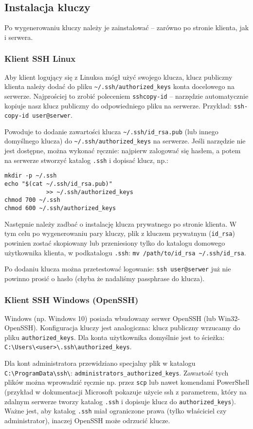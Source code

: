 \documentclass{article}
\begin{document}
\begin{multicols}{2}
\subsection{Instalacja kluczy}
Po wygenerowaniu kluczy należy je zainstalować -- zarówno po stronie klienta, jak i serwera.

\subsubsection{Klient SSH Linux}
Aby klient logujący się z Linuksa mógł użyć swojego klucza, klucz publiczny klienta należy dodać do pliku
\verb|~/.ssh/authorized_keys| konta docelowego na serwerze. Najprościej to zrobić poleceniem \verb|sshcopy-id| -- narzędzie automatycznie kopiuje nasz klucz publiczny do odpowiedniego pliku na serwerze. Przykład: \verb|ssh-copy-id user@serwer|.

Powoduje to dodanie zawartości klucza \verb|~/.ssh/id_rsa.pub| (lub innego domyślnego klucza) do \verb|~/.ssh/authorized_keys| na serwerze. Jeśli narzędzie nie jest dostępne, można wykonać ręcznie: najpierw zalogować się hasłem, a potem na serwerze stworzyć katalog \verb|.ssh| i dopisać klucz, np.: 
\begin{verbatim}
mkdir -p ~/.ssh
echo "$(cat ~/.ssh/id_rsa.pub)"
            >> ~/.ssh/authorized_keys
chmod 700 ~/.ssh
chmod 600 ~/.ssh/authorized_keys
\end{verbatim}

Następnie należy zadbać o instalację klucza prywatnego po stronie klienta. W tym celu po wygenerowaniu pary kluczy, plik z kluczem prywatnym (\verb|id_rsa|) powinien zostać skopiowany lub przeniesiony tylko do katalogu domowego użytkownika klienta, w podkatalogu \verb|.ssh|: \verb|mv /path/to/id_rsa ~/.ssh/id_rsa|.

Po dodaniu klucza można przetestować logowanie: \verb|ssh user@serwer| już nie powinno prosić o hasło
(chyba że nadaliśmy passphrase do klucza).

\subsubsection{Klient SSH Windows (OpenSSH)}
Windows (np. Windows 10) posiada wbudowany serwer OpenSSH (lub Win32-OpenSSH). Konfiguracja kluczy jest analogiczna: klucz publiczny wrzucamy do pliku \verb|authorized_keys|. Dla konta użytkownika domyślnie jest to ścieżka: \verb|C:\Users\<user>\.ssh\authorized_keys|.

Dla kont administratora przewidziano specjalny plik w katalogu \verb|C:\ProgramData\ssh\|: \verb|administrators_authorized_keys|. Zawartość tych plików można wprowadzić ręcznie np. przez \verb|scp| lub nawet komendami PowerShell (przykład w dokumentacji Microsoft pokazuje użycie ssh z parametrem, który na zdalnym serwerze tworzy katalog \verb|.ssh| i dopisuje klucz do \verb|authorized_keys|). Ważne jest, aby katalog \verb|.ssh| miał ograniczone prawa (tylko właściciel czy administrator), inaczej OpenSSH może odrzucić klucze.


\end{multicols}
\end{document}
